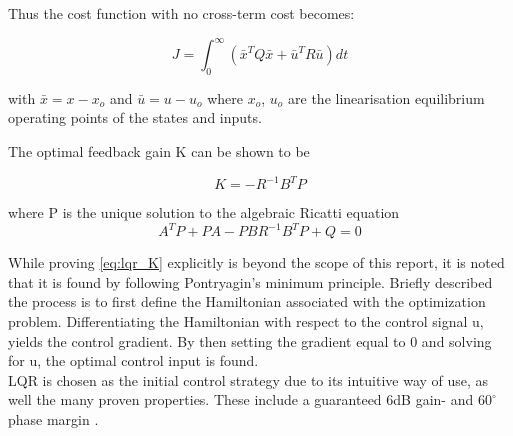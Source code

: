 Thus the cost function with no cross-term cost becomes:

\begin{equation} \label{eq:lqr_cost_fcn}
	J = \int_0^{\infty} \left( \bar{x}^TQ\bar{x} + \bar{u}^TR\bar{u} \right)dt
\end{equation}

with $\bar{x} = x-x_o$ and $\bar{u} = u-u_o$ where $x_o$, $u_o$ are the linearisation equilibrium operating points of the states and inputs.

The optimal feedback gain K can be shown to be

\begin{equation} \label{eq:lqr_K}
	K = -R^{-1}B^{T}P
\end{equation}

where P is the unique solution to the algebraic Ricatti equation
\begin{equation} \label{eq:ricatti}
	A^TP + PA - PBR^{-1}B^TP+Q = 0
\end{equation}

While proving \cref{eq:lqr_K} explicitly is beyond the scope of this report, it is noted that it is found by following Pontryagin's minimum principle. Briefly described the process is to first define the Hamiltonian associated with the optimization problem. Differentiating the Hamiltonian with respect to the control signal u, yields the control gradient. By then setting the gradient equal to 0 and solving for u, the optimal control input is found.
\\


LQR is chosen as the initial control strategy due to its intuitive way of use, as well the many proven properties. These include a guaranteed 6dB gain- and $60^\circ$ phase margin \cite{Doyle}.


